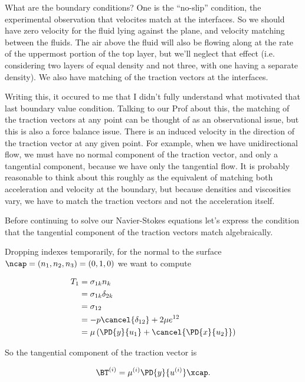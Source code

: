 What are the boundary conditions?  One is the ``no-slip'' condition, the experimental observation that velocites match at the interfaces.  So we should have zero velocity for the fluid lying against the plane, and velocity matching between the fluids.  The air above the fluid will also be flowing along at the rate of the uppermost portion of the top layer, but we'll neglect that effect (i.e. considering two layers of equal density and not three, with one having a separate density).  We also have matching of the traction vectors at the interfaces.  

Writing this, it occured to me that I didn't fully understand what motivated that last boundary value condition.  Talking to our Prof about this, the matching of the traction vectors at any point can be thought of as an observational issue, but this is also a force balance issue.  There is an induced velocity in the direction of the traction vector at any given point.  For example, when we have unidirectional flow, we must have no normal component of the traction vector, and only a tangential component, because we have only the tangential flow.  It is probably reasonable to think about this roughly as the equivalent of matching both acceleration and velocity at the boundary, but because densities and viscosities vary, we have to match the traction vectors and not the acceleration itself.

Before continuing to solve our Navier-Stokes equations let's express the condition that the tangential component of the traction vectors match algebraically.

Dropping indexes temporarily, for the normal to the surface $\ncap = (n_1, n_2, n_3) = (0, 1, 0)$ we want to compute

\begin{align*}
T_1 
&= \sigma_{1 k} n_k \\
&= \sigma_{1 k} \delta_{2 k} \\
&= \sigma_{1 2} \\
&= -p \cancel{\delta_{1 2}} + 2 \mu e^{1 2} \\
&= \mu \left( \PD{y}{u_1} + \cancel{\PD{x}{u_2}} \right) 
\end{align*}

So the tangential component of the traction vector is

\begin{equation}\label{eqn:twoLayerInclinedFlow:90}
\BT^{(i)} = \mu^{(i)} \PD{y}{u^{(i)}} \xcap.
\end{equation}

